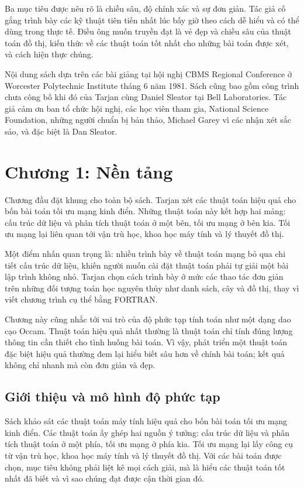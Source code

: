 \documentclass[11pt]{article}
\begin{document}
Ba mục tiêu được nêu rõ là chiều sâu, độ chính xác và sự đơn giản. Tác giả cố
gắng trình bày các kỹ thuật tiên tiến nhất lúc bấy giờ theo cách dễ hiểu và
có thể dùng trong thực tế. Điều ông muốn truyền đạt là vẻ đẹp và chiều sâu của
thuật toán đồ thị, kiến thức về các thuật toán tốt nhất cho những bài toán
được xét, và cách hiện thực chúng.

Nội dung sách dựa trên các bài giảng tại hội nghị CBMS Regional Conference ở
Worcester Polytechnic Institute tháng 6 năm 1981. Sách cũng bao gồm công trình
chưa công bố khi đó của Tarjan cùng Daniel Sleator tại Bell Laboratories. Tác
giả cảm ơn ban tổ chức hội nghị, các học viên tham gia, National Science
Foundation, những người chuẩn bị bản thảo, Michael Garey vì các nhận xét sắc
sảo, và đặc biệt là Dan Sleator.

\section{Chương 1: Nền tảng}

Chương đầu đặt khung cho toàn bộ sách. Tarjan xét các thuật toán hiệu quả cho
bốn bài toán tối ưu mạng kinh điển. Những thuật toán này kết hợp hai mảng:
cấu trúc dữ liệu và phân tích thuật toán ở một bên, tối ưu mạng ở bên kia.
Tối ưu mạng lại liên quan tới vận trù học, khoa học máy tính và lý thuyết đồ
thị.

Một điểm nhấn quan trọng là: nhiều trình bày về thuật toán mạng bỏ qua chi
tiết cấu trúc dữ liệu, khiến người muốn cài đặt thuật toán phải tự giải một
bài lập trình không nhỏ. Tarjan chọn cách trình bày ở mức các thao tác đơn
giản trên những đối tượng toán học nguyên thủy như danh sách, cây và đồ thị,
thay vì viết chương trình cụ thể bằng FORTRAN.

Chương này cũng nhắc tới vai trò của độ phức tạp tính toán như một dạng dao
cạo Occam. Thuật toán hiệu quả nhất thường là thuật toán chỉ tính đúng lượng
thông tin cần thiết cho tình huống bài toán. Vì vậy, phát triển một thuật toán
đặc biệt hiệu quả thường đem lại hiểu biết sâu hơn về chính bài toán; kết quả
không chỉ nhanh mà còn đơn giản và đẹp.

\subsection*{Giới thiệu và mô hình độ phức tạp}

Sách khảo sát các thuật toán máy tính hiệu quả cho bốn bài toán tối ưu mạng
kinh điển. Các thuật toán ấy ghép hai nguồn ý tưởng: cấu trúc dữ liệu và phân
tích thuật toán ở một phía, tối ưu mạng ở phía kia. Tối ưu mạng lại lấy công
cụ từ vận trù học, khoa học máy tính và lý thuyết đồ thị. Với các bài toán được
chọn, mục tiêu không phải liệt kê mọi cách giải, mà là hiểu các thuật toán tốt
nhất đã biết và vì sao chúng đạt được cận thời gian đó.
\end{document}
